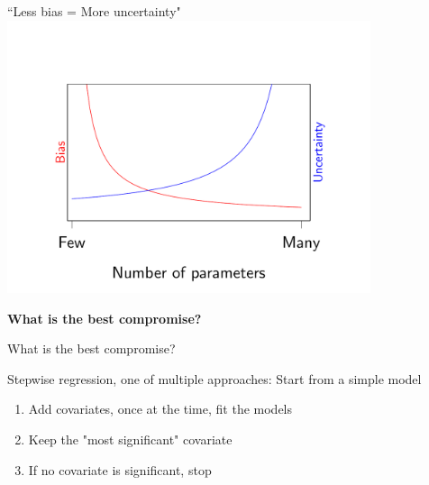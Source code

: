 \documentclass[10pt]{beamer}\usepackage[]{graphicx}\usepackage[]{color}
\newenvironment{knitrout}{}{} %
\begin{document}
\begin{frame}{``Less bias = More uncertainty"}
\centering
\begin{knitrout}\small
{}\color{fgcolor}
\includegraphics[width=0.8\textwidth,height=0.6\textwidth]{figure/unnamed-chunk-4-1} 

\end{knitrout}

\textbf{What is the best compromise?}

\end{frame}

\begin{frame}{What is the best compromise?}

\begin{block}{Stepwise regression, one of multiple approaches:}
  Start from a simple model
  \begin{enumerate}
    \item Add covariates, once at the time, fit the models
    \item Keep the "most significant" covariate
    \item If no covariate is significant, stop
  \end{enumerate}
\end{block}



\end{frame}
\end{document}
